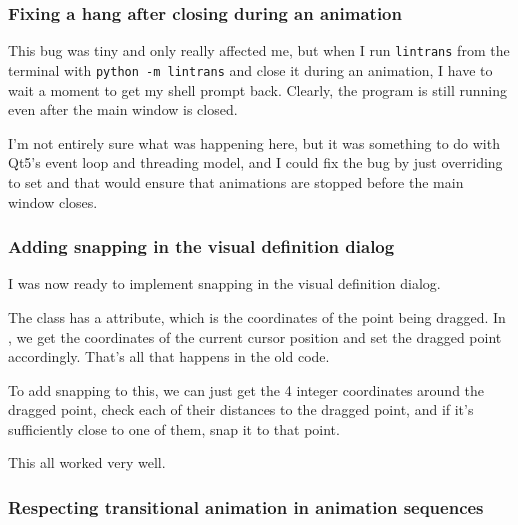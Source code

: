 \documentclass[../development.tex]{subfiles}
\begin{document}
\subsubsection{Fixing a hang after closing during an animation\label{development:teacher-suggestions:fixing-a-hang-after-closing-during-an-animation}}

This bug was tiny and only really affected me, but when I run \texttt{lintrans} from the terminal with \texttt{python -m lintrans} and close it during an animation, I have to wait a moment to get my shell prompt back. Clearly, the program is still running even after the main window is closed.

I'm not entirely sure what was happening here, but it was something to do with Qt5's event loop and threading model, and I could fix the bug by just overriding  to set  and that would ensure that animations are stopped before the main window closes.


\subsubsection{Adding snapping in the visual definition dialog\label{development:teacher-suggestions:adding-snapping-in-the-visual-definition-dialog}}

I was now ready to implement snapping in the visual definition dialog.

The  class has a  attribute, which is the coordinates of the point being dragged. In , we get the coordinates of the current cursor position and set the dragged point accordingly. That's all that happens in the old code.


To add snapping to this, we can just get the 4 integer coordinates around the dragged point, check each of their distances to the dragged point, and if it's sufficiently close to one of them, snap it to that point.


This all worked very well.

\subsubsection{Respecting transitional animation in animation sequences\label{development:teacher-suggestions:respecting-transitional-animation-in-animation-sequences}}
\end{document}
